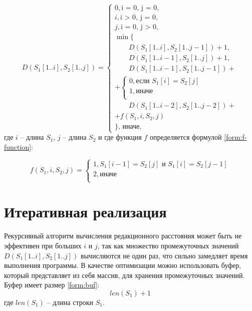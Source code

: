 \begin{equation}
	\label{form:d-lev}
	D(S_1[1..i], S_2[1..j]) = 
	\begin{cases}
		0, \text{i = 0, j = 0,}\\
	  	i, \text{i > 0, j = 0,}\\
	  	j, \text{i = 0, j > 0,}\\
	  	\min \lbrace \\
	  	\qquad D(S_1[1..i], S_2[1..j - 1]) + 1,\\
	  	\qquad D(S_1[1..i - 1], S_2[1..j]) + 1,\\
	  	\qquad D(S_1[1..i - 1], S_2[1..j - 1]) +\\
		+ 
	  	\begin{cases}
			0, \text{если }S_1[i] = S_2[j]\\
			1, \text{иначе}\\
	  	\end{cases}\\
	  	\qquad D(S_1[1..i - 2], S_2[1..j - 2]) + \\ + f(S_1, i, S_2, j)\\
	  	\rbrace \text{, иначе,}
	\end{cases}
\end{equation} 
где $i$ -- длина $S_1$, $j$ -- длина $S_2$ и где функция $f$ определяется формулой \ref{form:f-function}:  
  
\begin{equation}
	\label{form:f-function}
	f(S_1, i, S_2, j) = 
	\begin{cases}
		1, S_1[i-1] = S_2[j] \text{ и } S_1[i] = S_2[j - 1]\\
	  	2, \text{иначе}\\
	\end{cases}
\end{equation}

\section{Итеративная реализация}

Рекурсивный алгоритм вычисления редакционного расстояния может быть не эффективен при больших $i$ и $j$, так как множество промежуточных значений $D(S_1[1..i], S_2[1..j])$ вычисляются не один раз, что сильно замедляет время выполнения программы.
В качестве оптимизации можно использовать буфер, который представляет из себя массив, для хранения промежуточных значений.
Буфер имеет размер \ref{form:buf}:
\begin{equation}
	\label{form:buf}
	len(S_1) + 1
\end{equation}
где $len(S_1)$ -- длина строки $S_1$.

